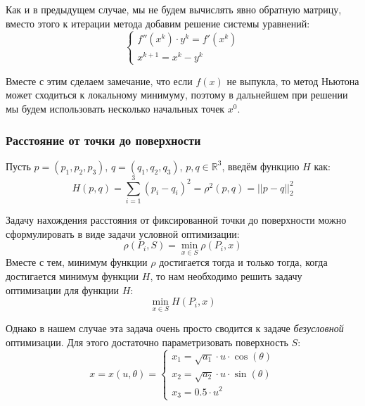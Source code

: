 \documentclass[12pt]{article}%
\begin{document}
Как и в предыдущем случае, мы не будем вычислять явно обратную матрицу, вместо этого к итерации метода добавим решение системы уравнений:
\begin{equation}
    \begin{cases}
        f''(x^k) \cdot y^k = f'(x^k) \\
        x^{k+1} = x^{k} - y^k
    \end{cases}
\end{equation}

Вместе с этим сделаем замечание, что если $f(x)$ не выпукла, то метод Ньютона может сходиться к локальному минимуму, поэтому в дальнейшем при решении мы будем использовать несколько начальных точек $x^0$.

\subsubsection{Расстояние от точки до поверхности}
Пусть $p = (p_1, p_2, p_3)$, $q = (q_1, q_2, q_3)$, $p, q \in \mathbb{R}^3$, введём функцию $H$ как:
\begin{equation*}
H(p, q) = \sum_{i=1}^3\left(p_i - q_i\right)^2 = 
\rho^2(p, q) = ||p - q||^2_2
\end{equation*}

Задачу нахождения расстояния от фиксированной точки до поверхности можно сформулировать в виде задачи условной оптимизации:
\begin{equation*}
    \rho(P_i, S) = \min_{x \in S}\rho(P_i, x)
\end{equation*}
Вместе с тем, минимум функции $\rho$ достигается тогда и только тогда, когда достигается минимум функции $H$, то нам необходимо решить задачу оптимизации для функции $H$:
\begin{equation*}
    \min_{x \in S}H(P_i, x)
\end{equation*}

Однако в нашем случае эта задача очень просто сводится к задаче \textit{безусловной} оптимизации. Для этого достаточно параметризовать поверхность $S$:
\begin{equation*}
    x = x(u, \theta) = 
    \begin{cases}
        x_1 = \sqrt{a_1} \cdot u \cdot \cos(\theta) \\
        x_2 = \sqrt{a_2} \cdot u \cdot \sin(\theta) \\
        x_3 = 0.5 \cdot u^2
    \end{cases}
\end{equation*}
\end{document}
